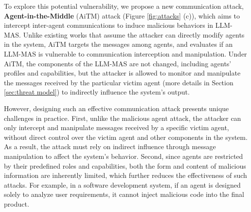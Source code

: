 
To explore this potential vulnerability, we propose a new communication attack, \textbf{Agent-in-the-Middle} (AiTM) attack (Figure \ref{fig:attacks} (c)), which aims to intercept inter-agent communications to induce malicious behaviors in LLM-MAS. Unlike existing works that assume the attacker can directly modify agents in the system, AiTM targets the messages among agents, and evaluates if an LLM-MAS is vulnerable to communication interception and manipulation. 
Under AiTM, the components of the LLM-MAS are not changed, including agents' profiles and capabilities, but the attacker is allowed to monitor and manipulate the messages received by the particular victim agent (more details in Section \ref{sec:threat model}) to indirectly influence the system's output.


However, designing such an effective communication attack presents unique challenges in practice. 
First, unlike the malicious agent attack, the attacker can only intercept and manipulate messages received by a specific victim agent, without direct control over the victim agent and other components in the system.
As a result, the attack must rely on indirect influence through message manipulation to affect the system's behavior.
Second, since agents are restricted by their predefined roles and capabilities, both the form and content of malicious information are inherently limited, which further reduces the effectiveness of such attacks. For example, in a software development system, if an agent is designed solely to analyze user requirements, it cannot inject malicious code into the final product. 

